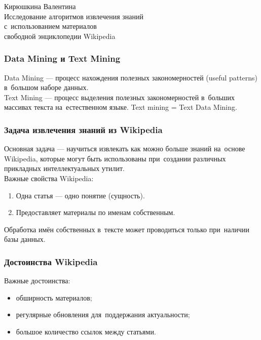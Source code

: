 \documentclass{beamer}
\begin{document}
\begin{frame}
\begin{center}
Кирюшкина Валентина \\
\vspace{1cm}
{\Large Исследование алгоритмов извлечения знаний \\
с~использованием материалов \\
свободной энциклопедии Wikipedia}\\ 
\end{center}
\end{frame}

\begin{frame}
\frametitle{Data Mining и Text Mining}
Data Mining --- процесс нахождения полезных закономерностей (useful patterns)  в~большом наборе данных.\\
\vspace{1cm}
Text Mining --- процесс выделения полезных закономерностей 
в~больших массивах текста на~естественном языке. 
Text mining = Text Data Mining.
\end{frame}

\begin{frame}
\frametitle{Задача извлечения знаний из Wikipedia}

Основная задача --- научиться извлекать как можно больше знаний на~основе Wikipedia,
которые могут быть использованы  при~создании различных прикладных интеллектуальных утилит.\\

Важные свойства Wikipedia:

\begin{enumerate}

\item {Одна статья --- одно понятие (сущность).}
\item{Предоставляет материалы по именам собственным.}

\end{enumerate}

Обработка имён собственных в~тексте может проводиться только при~наличии базы данных.

\end{frame}

\begin{frame}
\frametitle{Достоинства Wikipedia}

Важные достоинства:

\begin{itemize}
\item{обширность материалов;}
\item{регулярные обновления для~поддержания актуальности;}
\item{большое количество ссылок между статьями.}
\end{itemize}

\end{frame}
\end{document}
